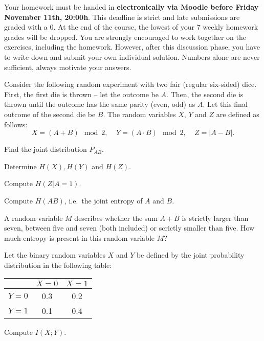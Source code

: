 \documentclass[a4paper,10pt,landscape,twocolumn]{scrartcl}
\newcommand\deadline{Friday November 11th, 20:00h}
\begin{document}
\homeworkproblems

{\sffamily\noindent
Your homework must be handed in \textbf{electronically via Moodle before \deadline}. This deadline is strict and late submissions are graded with a 0. At the end of the course, the lowest of your 7 weekly homework grades will be dropped. You are strongly encouraged to work together on the exercises, including the homework. However, after this discussion phase, you have to write down and submit your own individual solution. Numbers alone are never sufficient, always motivate your answers.
}

\begin{exercise}
Consider the following random experiment with two fair (regular six-sided) dice. First, the first die is thrown -- let the outcome be $A$. Then, the second die is thrown until the outcome has the same parity (even, odd) as $A$. Let this final outcome of the second die be $B$. The random variables $X$, $Y$ and $Z$ are defined as follows:
\[
X = (A + B) \mod 2, \ \ \ \ \ Y = (A \cdot B) \mod 2, \ \ \ \ \ Z = |A - B|.
\]
	\begin{subex}[(1pt)]
	Find the joint distribution $P_{AB}$.
	\end{subex}
	\begin{subex}[(3pt)]
	Determine $H(X), H(Y)$ and $H(Z)$.
	\end{subex}
	\begin{subex}[(1pt)]
	Compute $H(Z|A=1)$.
	\end{subex}
	\begin{subex}[(1pt)]
	Compute $H(AB)$, i.e.\ the joint entropy of $A$ and $B$.
	\end{subex}
	\begin{subex}[(2pt)]
	A random variable $M$ describes whether the sum $A + B$ is strictly larger than seven, between five and seven (both included) or scrictly smaller than five. How much entropy is present in this random variable $M$?
	\end{subex}
\end{exercise}

\newpage

\begin{exercise}
Let the binary random variables $X$ and $Y$ be defined by the joint probability distribution in the following table:
\begin{center}
\begin{tabular}{c | c | c}
& $X = 0$ & $X = 1$\\\hline
$Y = 0$ & 0.3 & 0.2\\
$Y = 1$ & 0.1 & 0.4
\end{tabular}
\end{center}
Compute $I(X;Y)$.
\end{exercise}
\end{document}
